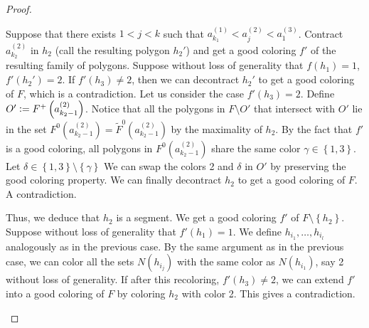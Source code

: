 \documentclass[12pt]{article}
\theoremstyle{definition}
\newcommand{\defeq}{\vcentcolon=}
\begin{document}
\begin{proof}
\begin{itemize}
             Suppose that there exists
             $1 < j < k$ such that
             $a_{k_1}^{\left(1\right)} <
             a_{j}^{\left(2\right)} <
             a_1^{\left(3\right)}$.
             Contract $a_{k_2}^{\left(2\right)}$ 
             in $h_2$ (call the resulting
             polygon $h_2'$)
             and get a good coloring
             $f'$ of the resulting family
             of polygons.
             Suppose without loss of
             generality that $f\left(h_1\right) = 1$,
             $f'\left(h_2'\right) = 2$.
             If $f'\left(h_3\right) \neq 2$, 
             then we can decontract $h_2'$ 
             to get a good coloring of $F$, 
             which is a contradiction.
             Let us consider the case
             $f'\left(h_3\right) = 2$.
             Define $O' \defeq F^{+}\left(a_{k_2 - 1}^{\left(2\right)}\right)$.
             Notice that all the polygons in
             $F \setminus O'$ that intersect with
             $O'$ lie in the set 
             $F^{0}\left(a_{k_2-1}^{\left(2\right)}\right) =
             \widetilde{F}^{0}\left(a_{k_2-1}^{\left(2\right)}\right)$
             by the maximality of $h_2$.
             By the fact that $f'$ is a
             good coloring, all polygons in $F^{0}\left(
             a_{k_2-1}^{\left(2\right)}\right)$
             share the same color $\gamma \in \left\{1, 3\right\}$.
             Let $\delta \in \left\{1, 3\right\} 
             \setminus \left\{\gamma\right\}$
             We can swap the colors 2 and $\delta$
             in $O'$ by preserving the good coloring 
             property.
             We can finally decontract $h_2$ to get
             a good coloring of $F$. 
             A contradiction.

             Thus, we deduce that $h_2$ is a segment.
             We get a good coloring $f'$ of
             $F \setminus \left\{h_2\right\}$.
             Suppose without loss of generality
             that $f'\left(h_1\right) = 1$.
             We define $h_{i_1}, \ldots, h_{i_{l}}$ 
             analogously as in the previous case.
             By the same argument as in the previous case,
             we can color all the sets 
             $N\left(h_{i_{j}}\right)$ with the
             same color as $N\left(h_{i_1}\right)$,
             say 2 without loss of generality.
             If after this recoloring,
             $f'\left(h_3\right) \neq 2$, 
             we can extend $f'$ into a
             good coloring of $F$ by 
             coloring $h_2$ with color 2.
             This gives a contradiction.
             

\end{itemize}
\end{proof}
\end{document}
